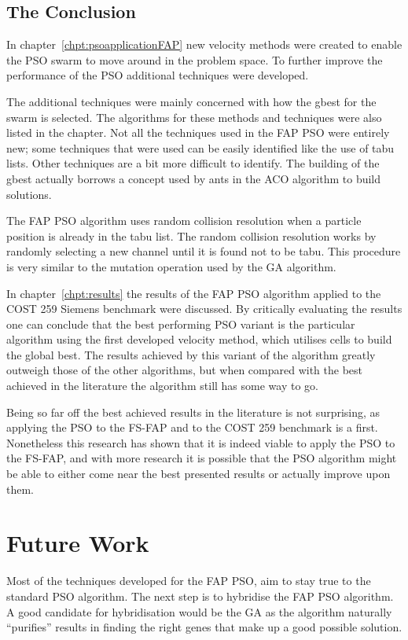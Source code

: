 \subsection{The Conclusion}
In chapter~\ref{chpt:psoapplicationFAP} new velocity methods were created to enable the PSO swarm to move around in the problem space. To further improve the performance of the PSO additional techniques were developed.

The additional techniques were mainly concerned with how the gbest for the swarm is selected. The algorithms for these methods and techniques were also listed in the chapter. Not all the techniques used in the FAP PSO were entirely new; some techniques that were used can be easily identified like the use of tabu lists. Other techniques are a bit more difficult to identify. The building of the gbest actually borrows a concept used by ants in the ACO algorithm to build solutions. 

The FAP PSO algorithm uses random collision resolution when a particle position is already in the tabu list. The random collision resolution works by randomly selecting a new channel until it is found not to be tabu. This procedure is very similar to the mutation operation used by the GA algorithm.

In chapter~\ref{chpt:results} the results of the FAP PSO algorithm applied to the COST 259 Siemens benchmark were discussed. By critically evaluating the results one can conclude that the best performing PSO variant is the particular algorithm using the first developed velocity method, which utilises cells to build the global best. The results achieved by this variant of the algorithm greatly outweigh those of the other algorithms, but when compared with the best achieved in the literature the algorithm still has some way to go.

Being so far off the best achieved results in the literature is not surprising, as applying the PSO to the FS-FAP and to the COST 259 benchmark is a first. Nonetheless this research has shown that it is indeed viable to apply the PSO to the FS-FAP, and with more research it is possible that the PSO algorithm might be able to either come near the best presented results or actually improve upon them.

\section{Future Work}
Most of the techniques developed for the FAP PSO, aim to stay true to the standard PSO algorithm. The next step is to hybridise the FAP PSO algorithm. A good candidate for hybridisation would be the GA as the algorithm naturally ``purifies'' results in finding the right genes that make up a good possible solution.

